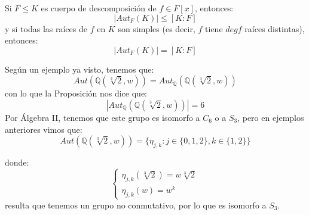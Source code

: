 \begin{prop}
    Si $F\leq K$ es cuerpo de descomposición de $f\in F[x]$, entonces: 
    \begin{equation*}
        |Aut_F(K)| \leq [K:F]
    \end{equation*}
    y si todas las raíces de $f$ en $K$ son simples (es decir, $f$ tiene $degf$ raíces distintas), entonces:
    \begin{equation*}
        |Aut_F(K)| = [K:F]
    \end{equation*}
\end{prop}

\begin{ejemplo}
    Según un ejemplo ya visto, tenemos que:
    \begin{equation*}
        Aut\left(\mathbb{Q}\left(\sqrt[3]{2}, w\right)\right) = Aut_\mathbb{Q}\left(\mathbb{Q}\left(\sqrt[3]{2}, w\right)\right)
    \end{equation*}
    con lo que la Proposición nos dice que:
    \begin{equation*}
        |Aut_\mathbb{Q}(\mathbb{Q}(\sqrt[3]{2},w))| = 6
    \end{equation*}
    Por Álgebra II, tenemos que este grupo es isomorfo a $C_6$ o a $S_3$, pero en ejemplos anteriores vimos que:
    \begin{equation*}
        Aut\left(\mathbb{Q}\left(\sqrt[3]{2},w\right)\right) = \{\eta_{j,k} : j \in \{0,1,2\}, k\in \{1,2\}\}
    \end{equation*}

    donde:
    \begin{equation*}
        \left\{\begin{array}{l}
                \eta_{j,k}(\sqrt[3]{2}) = w\sqrt[3]{2} \\
                \eta_{j,k}(w) = w^k
        \end{array}\right.
    \end{equation*} %
    resulta que tenemos un grupo no conmutativo, por lo que es isomorfo a $S_3$.
\end{ejemplo}

